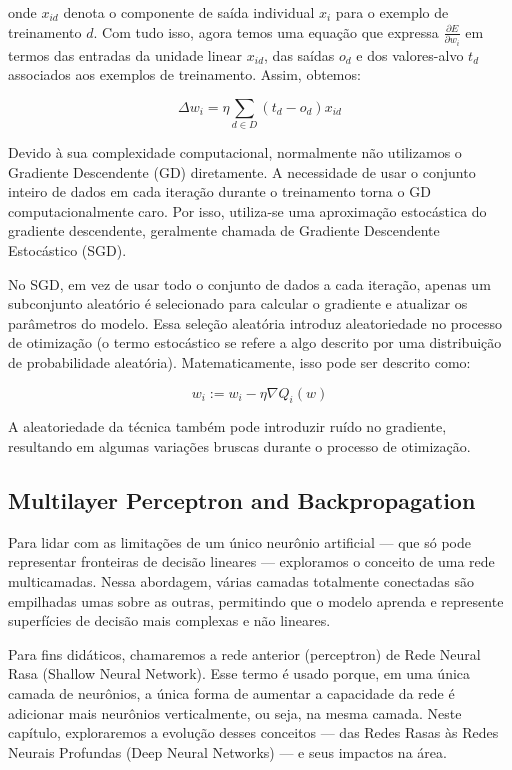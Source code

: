 \documentclass{tufte-handout}
\begin{document}
onde $x_{id}$ denota o componente de saída individual $x_i$ para o exemplo de treinamento $d$.
Com tudo isso, agora temos uma equação que expressa $\frac{\partial E}{\partial w_i}$ em termos das entradas da unidade linear $x_{id}$, das saídas $o_d$ e dos valores-alvo $t_d$ associados aos exemplos de treinamento. Assim, obtemos:

\begin{equation}
\Delta w_i = \eta \sum_{d \in D} (t_d - o_d)x_{id}
\end{equation}

Devido à sua complexidade computacional, normalmente não utilizamos o Gradiente Descendente (GD) diretamente.
A necessidade de usar o conjunto inteiro de dados em cada iteração durante o treinamento torna o GD computacionalmente caro.
Por isso, utiliza-se uma aproximação estocástica do gradiente descendente, geralmente chamada de Gradiente Descendente Estocástico (SGD).

No SGD, em vez de usar todo o conjunto de dados a cada iteração, apenas um subconjunto aleatório é selecionado para calcular o gradiente e atualizar os parâmetros do modelo.
Essa seleção aleatória introduz aleatoriedade no processo de otimização (o termo estocástico se refere a algo descrito por uma distribuição de probabilidade aleatória).
Matematicamente, isso pode ser descrito como:

\begin{equation}
w_i := w_i - \eta \nabla Q_i (w)
\end{equation}

A aleatoriedade da técnica também pode introduzir ruído no gradiente, resultando em algumas variações bruscas durante o processo de otimização.

\subsection{Multilayer Perceptron and Backpropagation}
Para lidar com as limitações de um único neurônio artificial — que só pode representar fronteiras de decisão lineares — exploramos o conceito de uma rede multicamadas.
Nessa abordagem, várias camadas totalmente conectadas são empilhadas umas sobre as outras, permitindo que o modelo aprenda e represente superfícies de decisão mais complexas e não lineares.

Para fins didáticos, chamaremos a rede anterior (perceptron) de Rede Neural Rasa (Shallow Neural Network). Esse termo é usado porque, em uma única camada de neurônios, a única forma de aumentar a capacidade da rede é adicionar mais neurônios verticalmente, ou seja, na mesma camada.
Neste capítulo, exploraremos a evolução desses conceitos — das Redes Rasas às Redes Neurais Profundas (Deep Neural Networks) — e seus impactos na área.
\end{document}
